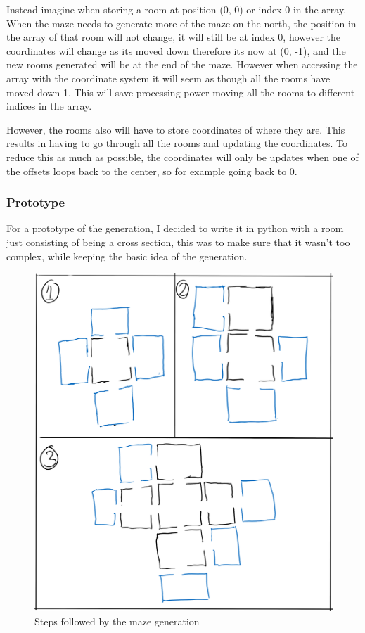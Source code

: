\documentclass[../Main.tex]{subfiles}
\begin{document}
            Instead imagine when storing a room at position (0, 0) or index 0 in the array. When the maze needs to generate more of the maze on the north, the position in the array of that room will not change, it will still be at index 0, however the coordinates will change as its moved down therefore its now at (0, -1), and the new rooms generated will be at the end of the maze. However when accessing the array with the coordinate system it will seem as though all the rooms have moved down 1. This will save processing power moving all the rooms to different indices in the array.

            However, the rooms also will have to store coordinates of where they are. This results in having to go through all the rooms and updating the coordinates. To reduce this as much as possible, the coordinates will only be updates when one of the offsets loops back to the center, so for example going back to 0.

        \clearpage
        \subsubsection{Prototype}
        For a prototype of the generation, I decided to write it in python with a room just consisting of being a cross section, this was to make sure that it wasn't too complex, while keeping the basic idea of the generation.
        \begin{figure}[hbt!]
            \centerline{\includegraphics[scale=0.5]{img/Design/Maze Generation.png}}
            \caption{Steps followed by the maze generation}
            \label{fig:MazeGen}
        \end{figure}
\end{document}
